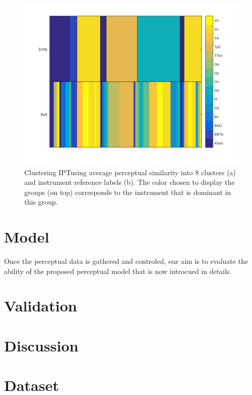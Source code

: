 \documentclass{article}
\newcommand{\ipt}{IPT}
\begin{document}
\begin{figure}
\center
\includegraphics[width = \textwidth]{figures/groupInstruments.png}
\caption{Clustering \ipt using average perceptual similarity into 8 clusters (a) and instrument reference labels (b). The color chosen to display the groups (on top) corresponds  to the instrument that is dominant in this group.}
\label{fig:gi}
\end{figure}

\section{Model}\label{sec:model}

Once the perceptual data is gathered and controled, our aim is to evaluate the ability of the proposed perceptual model that is now introcued in details.

\section{Validation}\label{sec:validation}

\section{Discussion}\label{sec:discussion}






\section{Dataset}
\end{document}
